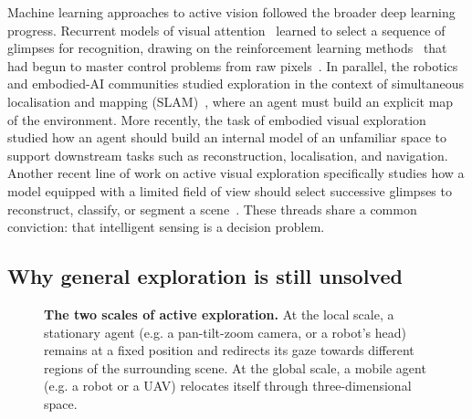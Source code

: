 Machine learning approaches to active vision followed the broader deep learning progress.
Recurrent models of visual attention~\cite{mnih2014recurrent} learned to select a sequence of glimpses for recognition,
drawing on the reinforcement learning methods~\cite{sutton2018reinforcement} that had begun to master control
problems from raw pixels~\cite{mnih2015human}. In parallel, the robotics and embodied-AI communities studied exploration in the context of simultaneous
localisation and mapping (SLAM)~\cite{cadena2016past}, where an agent must build an explicit map of the environment.
More recently, the task of embodied visual exploration~\cite{ramakrishnan2021exploration} studied how an agent should build an internal model of an unfamiliar space to support downstream tasks such as reconstruction, localisation, and navigation.
 Another recent line of work on active visual exploration specifically studies how a model equipped with a
limited field of view should select successive glimpses to reconstruct,
classify, or segment a scene~\cite{seifi2021glimpse}. These threads share a common conviction: that intelligent sensing is a decision problem.

\subsection{Why general exploration is still unsolved}

\begin{figure}[t]
    \centering
    
    \caption[The two scales of active exploration]{\textbf{The two scales of active exploration.} At the local scale, a stationary agent (e.g. a pan-tilt-zoom camera, or a robot's head) remains at a fixed position and redirects its gaze towards different regions of the surrounding scene. At the global scale, a mobile agent (e.g. a robot or a UAV) relocates itself through three-dimensional space.}
    \label{fig:local-global}
\end{figure}

